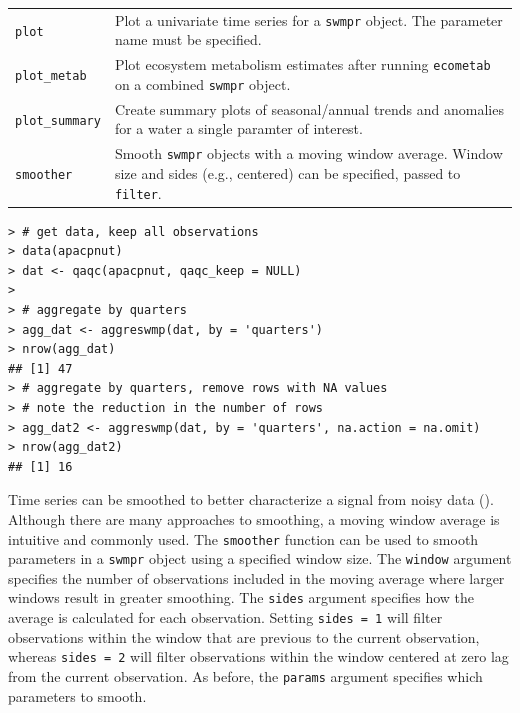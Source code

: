 \documentclass[10pt,letterpaper]{article}\usepackage[]{graphicx}\usepackage[]{color}
\makeatletter
\newenvironment{kframe}{%
 \def\at@end@of@kframe{}%
 \ifinner\ifhmode%
  \def\at@end@of@kframe{\end{minipage}}%
  \begin{minipage}{\columnwidth}%
 \fi\fi%
 \def\FrameCommand##1{\hskip\@totalleftmargin \hskip-\fboxsep
 \colorbox{shadecolor}{##1}\hskip-\fboxsep
     \hskip-\linewidth \hskip-\@totalleftmargin \hskip\columnwidth}%
 \MakeFramed {\advance\hsize-\width
   \@totalleftmargin\z@ \linewidth\hsize
   \@setminipage}}%
 {\par\unskip\endMakeFramed%
 \at@end@of@kframe}
\newenvironment{knitrout}{}{} %
\makeatother
\begin{document}
\begin{table}[!tbp]
\begin{center}
\begin{tabular}{lp{3.5in}}
\texttt{plot}&Plot a univariate  time series for a \texttt{swmpr} object.  The parameter name must be specified.\tabularnewline
\texttt{plot\_metab}&Plot ecosystem metabolism estimates after running \texttt{ecometab} on a combined \texttt{swmpr} object.\tabularnewline
\texttt{plot\_summary}&Create summary plots of seasonal/annual trends and anomalies for a water a single paramter of interest.\tabularnewline
\texttt{smoother}&Smooth \texttt{swmpr} objects with a moving window average.  Window size and sides (e.g., centered) can be specified, passed to \texttt{filter}.\tabularnewline
\hline
\end{tabular}\end{center}

\end{table}


\begin{knitrout}\small
{}\color{fgcolor}\begin{kframe}
\begin{verbatim}
> # get data, keep all observations
> data(apacpnut)
> dat <- qaqc(apacpnut, qaqc_keep = NULL)
> 
> # aggregate by quarters
> agg_dat <- aggreswmp(dat, by = 'quarters')
> nrow(agg_dat)
## [1] 47
> # aggregate by quarters, remove rows with NA values
> # note the reduction in the number of rows
> agg_dat2 <- aggreswmp(dat, by = 'quarters', na.action = na.omit)
> nrow(agg_dat2)
## [1] 16
\end{verbatim}
\end{kframe}
\end{knitrout}

Time series can be smoothed to better characterize a signal from noisy data ().  Although there are many approaches to smoothing, a moving window average is intuitive and commonly used.  The \texttt{smoother} function can be used to smooth parameters in a \texttt{swmpr} object using a specified window size.  The \texttt{window} argument specifies the number of observations included in the moving average where larger windows result in greater smoothing.  The \texttt{sides} argument specifies how the average is calculated for each observation.  Setting \texttt{sides = 1} will filter observations within the window that are previous to the current observation, whereas \texttt{sides = 2} will filter observations within the window centered at zero lag from the current observation. As before, the \texttt{params} argument specifies which parameters to smooth.
\end{document}
